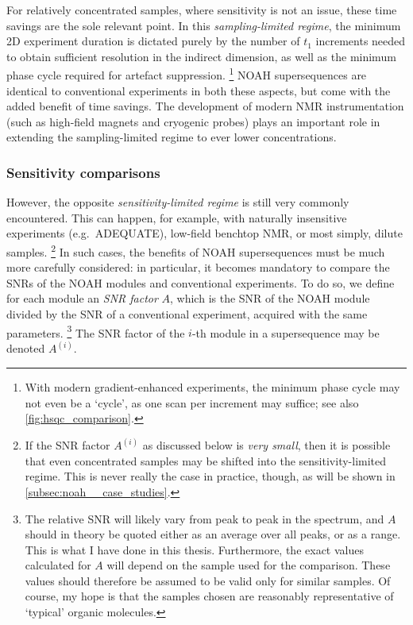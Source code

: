 For relatively concentrated samples, where sensitivity is not an issue, these time savings are the sole relevant point.
In this \textit{sampling-limited regime}, the minimum 2D experiment duration is dictated purely by the number of $t_1$ increments needed to obtain sufficient resolution in the indirect dimension, as well as the minimum phase cycle required for artefact suppression.%
\footnote{With modern gradient-enhanced experiments, the minimum phase cycle may not even be a `cycle', as one scan per increment may suffice; see also \cref{fig:hsqc_comparison}.}
NOAH supersequences are identical to conventional experiments in both these aspects, but come with the added benefit of time savings.
The development of modern NMR instrumentation (such as high-field magnets and cryogenic probes) plays an important role in extending the sampling-limited regime to ever lower concentrations.


\subsubsection{Sensitivity comparisons}

However, the opposite \textit{sensitivity-limited regime} is still very commonly encountered.
This can happen, for example, with naturally insensitive experiments (e.g.\ ADEQUATE), low-field benchtop NMR, or most simply, dilute samples.%
\footnote{If the SNR factor $A^{(i)}$ as discussed below is \textit{very small}, then it is possible that even concentrated samples may be shifted into the sensitivity-limited regime. This is never really the case in practice, though, as will be shown in \cref{subsec:noah__case_studies}.}
In such cases, the benefits of NOAH supersequences must be much more carefully considered: in particular, it becomes mandatory to compare the SNRs of the NOAH modules and conventional experiments.
To do so, we define for each module an \textit{SNR factor} $A$, which is the SNR of the NOAH module divided by the SNR of a conventional experiment, acquired with the same parameters.%
\footnote{The relative SNR will likely vary from peak to peak in the spectrum, and $A$ should in theory be quoted either as an average over all peaks, or as a range. This is what I have done in this thesis.
Furthermore, the exact values calculated for $A$ will depend on the sample used for the comparison.
These values should therefore be assumed to be valid only for similar samples.
Of course, my hope is that the samples chosen are reasonably representative of `typical' organic molecules.}
The SNR factor of the $i$-th module in a supersequence may be denoted $A^{(i)}$.

